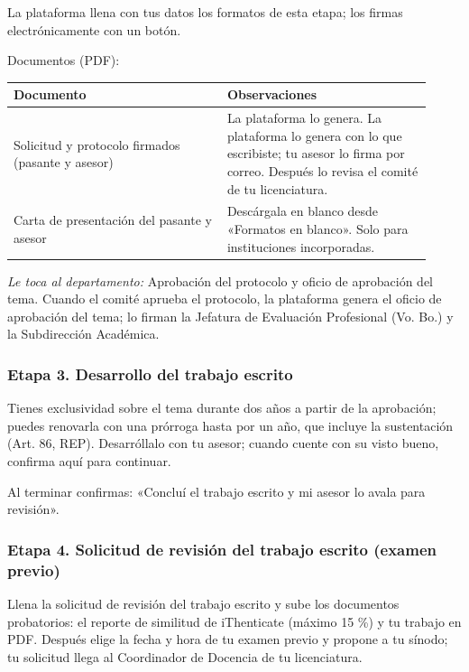 La plataforma llena con tus datos los formatos de esta etapa; los firmas electrónicamente con un botón.

Documentos (PDF):
{\small\begin{longtable}{>{\raggedright\arraybackslash}p{0.47\linewidth}>{\raggedright\arraybackslash}p{0.45\linewidth}}
\toprule
\textbf{Documento} & \textbf{Observaciones}\\
\midrule
\endhead
Solicitud y protocolo firmados (pasante y asesor) & La plataforma lo genera. La plataforma lo genera con lo que escribiste; tu asesor lo firma por correo. Después lo revisa el comité de tu licenciatura.\\
Carta de presentación del pasante y asesor & Descárgala en blanco desde «Formatos en blanco». Solo para instituciones incorporadas.\\
\bottomrule
\end{longtable}}

\emph{Le toca al departamento:} Aprobación del protocolo y oficio de aprobación del tema. Cuando el comité aprueba el protocolo, la plataforma genera el oficio de aprobación del tema; lo firman la Jefatura de Evaluación Profesional (Vo. Bo.) y la Subdirección Académica.
\subsubsection*{Etapa 3. Desarrollo del trabajo escrito}
Tienes exclusividad sobre el tema durante dos años a partir de la aprobación; puedes renovarla con una prórroga hasta por un año, que incluye la sustentación (Art. 86, REP). Desarróllalo con tu asesor; cuando cuente con su visto bueno, confirma aquí para continuar.

Al terminar confirmas: «Concluí el trabajo escrito y mi asesor lo avala para revisión».
\subsubsection*{Etapa 4. Solicitud de revisión del trabajo escrito (examen previo)}
Llena la solicitud de revisión del trabajo escrito y sube los documentos probatorios: el reporte de similitud de iThenticate (máximo 15 \%) y tu trabajo en PDF. Después elige la fecha y hora de tu examen previo y propone a tu sínodo; tu solicitud llega al Coordinador de Docencia de tu licenciatura.

